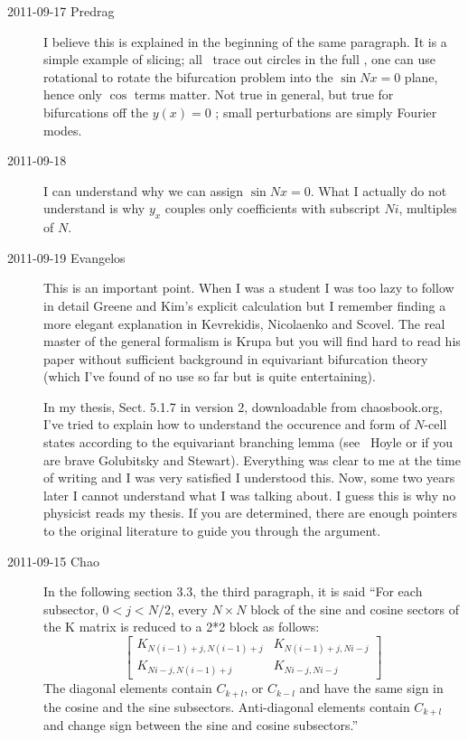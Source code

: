 \begin{description}
\item[2011-09-17 Predrag] I believe this is explained in the beginning of
the same paragraph. It is a simple example of slicing; all \reqva\ trace
out circles in the full \statesp, one can use rotational  to
rotate the bifurcation problem into the $\sin Nx = 0$ plane, hence only $\cos$
terms matter. Not true in general, but true for bifurcations off the $y(x)=0$
\eqv; small perturbations are simply Fourier modes.


\item[2011-09-18] I can understand why we can assign $\sin Nx = 0$. What I actually
do not understand is why $y_x$ couples only coefficients with subscript $Ni$, multiples
of  $N$.

\item[2011-09-19 Evangelos] This is an important point. When I was a student
I was too lazy to follow in detail Greene and Kim's explicit calculation but
I remember finding a more elegant explanation in Kevrekidis, Nicolaenko
and Scovel. The real master of the general formalism is
Krupa but you will find hard to read his paper without sufficient
background in equivariant bifurcation theory (which I've found of no use so
far but is quite entertaining).

In my thesis, Sect. 5.1.7 in version 2, downloadable from chaosbook.org,
I've tried to explain how to understand the occurence and form of $N$-cell
states according to the equivariant branching lemma
(see \eg\ Hoyle or if you are brave Golubitsky and Stewart).
Everything was clear to me at the time of
writing and I was very satisfied I understood this. Now, some two years later I cannot
understand what I was talking about. I guess this is why no physicist
reads my thesis. If you are determined, there are enough pointers to the
original literature to guide you through the argument.

\item[2011-09-15 Chao]
In the following section 3.3, the third paragraph, it is said ``For each
subsector, $0<j<N/2$, every $N \times N$ block of the sine and cosine sectors of the
K matrix is reduced to a 2*2 block as follows:
\[
\left[
\begin{array}{cc}
K_{N(i-1)+j,N(i-1)+j}   &  K_{N(i-1)+j,Ni-j}\\
K_{Ni-j,N(i-1)+j}   &   K_{Ni-j,Ni-j}
\end{array}
\right]
\]
The diagonal elements contain $C_{k+l}$, or $C_{k-l}$ and have the same
sign in the cosine and the sine subsectors. Anti-diagonal elements
contain $C_{k+l}$ and change sign between the sine and cosine
subsectors.''


\end{description}
